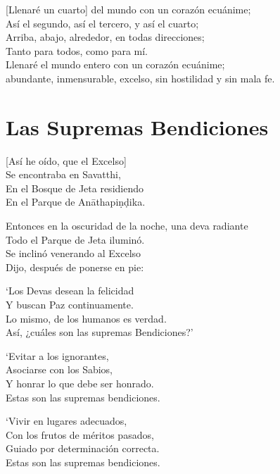 [Llenaré un cuarto] del mundo con un corazón ecuánime;\\
Así el segundo, así el tercero, y así el cuarto;\\
Arriba, abajo, alrededor, en todas direcciones;\\
Tanto para todos, como para mí.\\
Llenaré el mundo entero con un corazón ecuánime;\\ abundante, inmensurable, excelso, sin hostilidad y sin mala fe.


\clearpage

\chapter{Las Supremas Bendiciones}


\begin{leader}
\end{leader}

[Así he oído, que el Excelso]\\
Se encontraba en Savatthi,\\
En el Bosque de Jeta residiendo\\
En el Parque de Anāthapiṇḍika.

Entonces en la oscuridad de la noche, una deva radiante\\
Todo el Parque de Jeta iluminó.\\
Se inclinó venerando al Excelso\\
Dijo, después de ponerse en pie:

`Los Devas desean la felicidad\\
Y buscan Paz continuamente.\\
Lo mismo, de los humanos es verdad.\\
Así, ¿cuáles son las supremas Bendiciones?'

`Evitar a los ignorantes,\\
Asociarse con los Sabios,\\
Y honrar lo que debe ser honrado.\\
Estas son las supremas bendiciones.

`Vivir en lugares adecuados,\\
Con los frutos de méritos pasados,\\
Guiado por determinación correcta.\\
Estas son las supremas bendiciones.

